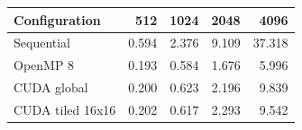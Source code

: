 \begin{tabular}{lrrrr}
\hline
Configuration & 512 & 1024 & 2048 & 4096 \\
\hline
Sequential & 0.594 & 2.376 & 9.109 & 37.318 \\
OpenMP 8 & 0.193 & 0.584 & 1.676 & 5.996 \\
CUDA global & 0.200 & 0.623 & 2.196 & 9.839 \\
CUDA tiled 16x16 & 0.202 & 0.617 & 2.293 & 9.542 \\
\hline
\end{tabular}